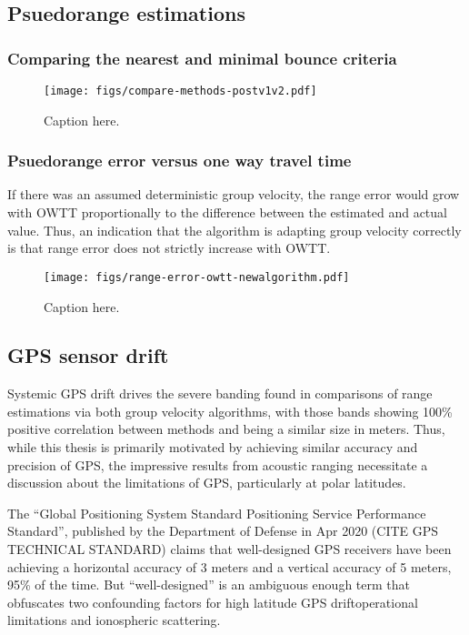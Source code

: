 \subsection{Psuedorange estimations}

\subsubsection{Comparing the nearest and minimal bounce criteria}

\begin{figure}[h!]
\texttt{[image: figs/compare-methods-postv1v2.pdf]}
\caption{\label{fig:gvel30}{Caption here.}}
\end{figure}

\FloatBarrier
\subsubsection{Psuedorange error versus one way travel time}

If there was an assumed deterministic group velocity, the range error would grow with OWTT proportionally to the difference between the estimated and actual value.
Thus, an indication that the algorithm is adapting group velocity correctly is that range error does not strictly increase with OWTT.

\begin{figure}[h!]
\texttt{[image: figs/range-error-owtt-newalgorithm.pdf]}
\caption{\label{fig:gvel30}{Caption here.}}
\end{figure}

\FloatBarrier
\subsection{GPS sensor drift}

Systemic GPS drift drives the severe banding found in comparisons of range estimations via both group velocity algorithms, with those bands showing 100\% positive correlation between methods and being a similar size in meters.
Thus, while this thesis is primarily motivated by achieving similar accuracy and precision of GPS, the impressive results from acoustic ranging necessitate a discussion about the limitations of GPS, particularly at polar latitudes.

The ``Global Positioning System Standard Positioning Service Performance Standard'', published by the Department of Defense in Apr 2020 (CITE GPS TECHNICAL STANDARD) claims that well-designed GPS receivers have been achieving a horizontal accuracy of 3 meters and a vertical accuracy of 5 meters, 95\% of the time.
But ``well-designed'' is an ambiguous enough term that obfuscates two confounding factors for high latitude GPS drift\textemdash operational limitations and ionospheric scattering.

